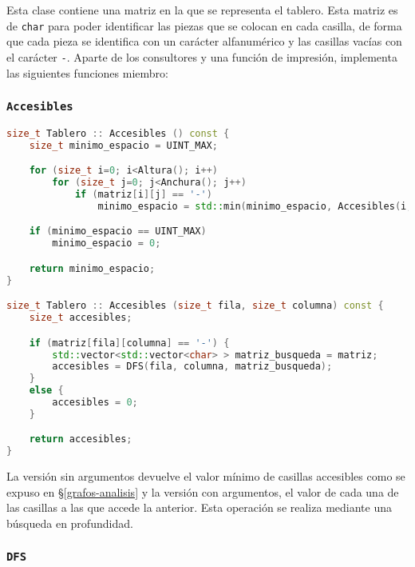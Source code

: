 Esta clase contiene una matriz en la que se representa el tablero.
Esta matriz es de \texttt{char} para poder identificar las piezas que se colocan en cada casilla, de forma que cada pieza se identifica con un carácter alfanumérico y las casillas vacías con el carácter \texttt{-}.
Aparte de los consultores y una función de impresión, implementa las siguientes funciones miembro:

\pagebreak

\subsubsection{\texttt{Accesibles}}\label{grafos-implementacion-tablero-accesibles}

\begin{lstlisting}[language=C++]
size_t Tablero :: Accesibles () const {
	size_t minimo_espacio = UINT_MAX;

	for (size_t i=0; i<Altura(); i++)
		for (size_t j=0; j<Anchura(); j++)
			if (matriz[i][j] == '-')
				minimo_espacio = std::min(minimo_espacio, Accesibles(i, j));

	if (minimo_espacio == UINT_MAX)
		minimo_espacio = 0;

	return minimo_espacio;
}

size_t Tablero :: Accesibles (size_t fila, size_t columna) const {
	size_t accesibles;

	if (matriz[fila][columna] == '-') {
		std::vector<std::vector<char> > matriz_busqueda = matriz;
		accesibles = DFS(fila, columna, matriz_busqueda);
	}
	else {
		accesibles = 0;
	}

	return accesibles;
}
\end{lstlisting}

La versión sin argumentos devuelve el valor mínimo de casillas accesibles como se expuso en \S\ref{grafos-analisis} y la versión con argumentos, el valor de cada una de las casillas a las que accede la anterior.
Esta operación se realiza mediante una búsqueda en profundidad.

\subsubsection{\texttt{DFS}}\label{grafos-implementacion-tablero-dfs}

